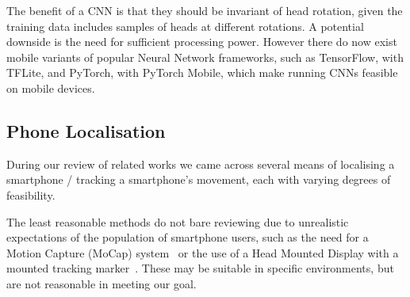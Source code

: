 The benefit of a CNN is that they should be invariant of head rotation, given the training data includes samples of heads at different rotations.
A potential downside is the need for sufficient processing power. However there do now exist mobile variants of popular Neural Network frameworks, such as TensorFlow, with TFLite, and PyTorch, with PyTorch Mobile, which make running CNNs feasible on mobile devices.



\subsection{Phone Localisation}
During our review of related works we came across several means of localising a smartphone / tracking a smartphone's movement, each with varying degrees of feasibility.

The least reasonable methods do not bare reviewing due to unrealistic expectations of the population of smartphone users, such as the need for a Motion Capture (MoCap) system~\cite{buschel2017investigating} or the use of a Head Mounted Display with a mounted tracking marker~\cite{mohr2019trackcap}.
These may be suitable in specific environments, but are not reasonable in meeting our goal.

